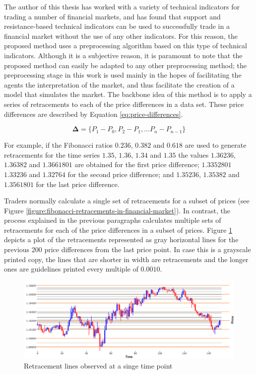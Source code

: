 The author of this thesis has worked with a variety of technical indicators for
trading a number of financial markets, and has found that support and
resistance-based technical indicators can be used to successfully trade in a
financial market without the use of any other indicators. For this reason, the
proposed method uses a preprocessing algorithm based on this type of technical
indicators. Although it is a subjective reason, it is paramount to note that the
proposed method can easily be adapted to any other preprocessing method; the
preprocessing stage in this work is used mainly in the hopes of facilitating the
agents the interpretation of the market, and thus facilitate the creation of a
model that simulates the market. The backbone idea of this method is to apply a
series of retracements to each of the price differences in a data set. These
price differences are described by Equation \ref{eq:price-differences}.

\begin{equation}
  \label{eq:price-differences}
  \bm{\Delta} = \{ P_1 - P_0, P_2 - P_1, \ldots P_n - P_{n-1} \}
\end{equation}

For example, if the Fibonacci ratios $0.236$, $0.382$ and $0.618$ are used to
generate retracements for the time series $1.35$, $1.36$, $1.34$ and $1.35$ the
values $1.36236$, $1.36382$ and $1.3661801$ are obtained for the first price
difference; $1.3352801$ $1.33236$ and $1.32764$ for the second price difference;
and $1.35236$, $1.35382$ and $1.3561801$ for the last price difference.

Traders normally calculate a single set of retracements for a subset of prices
(see Figure \ref{figure:fibonacci-retracements-in-financial-market}). In
contrast, the process explained in the previous paragraphs calculates multiple
sets of retracements for each of the price differences in a subset of
prices. Figure \ref{figure:retracements-one-price} depicts a plot of the
retracements represented as gray horizontal lines for the previous 200 price
differences from the last price point. In case this is a grayscale printed copy,
the lines that are shorter in width are retracements and the longer ones are
guidelines printed every multiple of $0.0010$.

\begin{figure}
\centering
\includegraphics[width=1.0\textwidth]{img/retracements-preprocessing-one-price.png}
\caption{Retracement lines observed at a singe time point}
\label{figure:retracements-one-price}
\end{figure}

